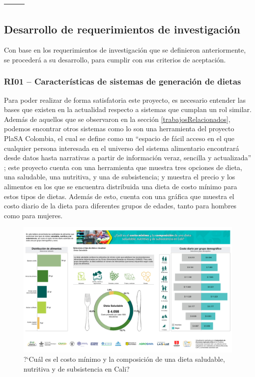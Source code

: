 \begin{longtable}[c]{| p{}  | p{}  | p{}  |}
\begin{itemize}
         \end{itemize} \\  \hline

\end{longtable}


\subsection{Desarrollo de requerimientos de investigaci\'on}
Con base en los requerimientos de investigaci\'on que se definieron anteriormente, se proceder\'a a su desarrollo, para cumplir con sus criterios de aceptaci\'on.

\subsubsection{RI01 -- Caracter\'isticas de sistemas de generaci\'on de dietas}

\noindent Para poder realizar de forma satisfatoria este proyecto, es necesario entender las bases que existen en la actualidad respecto a sistemas que cumplan un rol similar. Adem\'as de aquellos que se observaron en la secci\'on \ref{trabajosRelacionados}, podemos encontrar otros sistemas como lo son una herramienta del proyecto PlaSA Colombia, el cual se define como un ``espacio de f\'acil acceso en el que cualquier persona interesada en el universo del sistema alimentario encontrar\'a desde datos hasta narrativas a partir de informaci\'on veraz, sencilla y actualizada'' \cite{Nosotros}; este proyecto cuenta con una herramienta que muestra tres opciones de dieta, una saludable, una nutritiva, y una de subsistencia; y muestra el precio y los alimentos en los que se encuentra distribuida una dieta de costo m\'inimo para estos tipos de dietas. Adem\'as de esto, cuenta con una gr\'afica que muestra el costo diario de la dieta para diferentes grupos de edades, tanto para hombres como para mujeres.


\begin{figure}[H]
    \centering
    \includegraphics[width=15cm]{img/metodologia/Dashboard 1.png}
    \caption{?`Cu\'al es el costo m\'inimo y la composici\'on de una dieta saludable, nutritiva y de subsistencia en Cali?}
    \label{fig:plasaColombia}
\end{figure}

